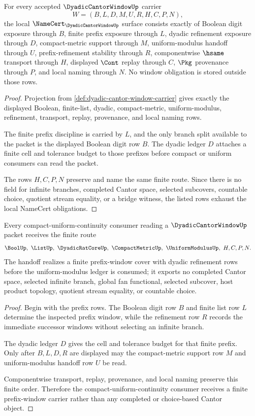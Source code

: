 \begin{theorem}
\label{thm:dyadic-cantor-window-namecert-obligations}
For every accepted $\DyadicCantorWindowUp$ carrier
$$
W=(B,L,D,M,U,R,H,C,P,N),
$$
the local $\NameCert_{\DyadicCantorWindowUp}$ surface consists exactly of Boolean digit exposure through $B$, finite prefix exposure through $L$, dyadic refinement exposure through $D$, compact-metric support through $M$, uniform-modulus handoff through $U$, prefix-refinement stability through $R$, componentwise $\hsame$ transport through $H$, displayed $\Cont$ replay through $C$, $\Pkg$ provenance through $P$, and local naming through $N$. No window obligation is stored outside those rows.
\end{theorem}
\begin{proof}
Projection from \autoref{def:dyadic-cantor-window-carrier} gives exactly the displayed Boolean, finite-list, dyadic, compact-metric, uniform-modulus, refinement, transport, replay, provenance, and local naming rows.

The finite prefix discipline is carried by $L$, and the only branch split available to the packet is the displayed Boolean digit row $B$. The dyadic ledger $D$ attaches a finite cell and tolerance budget to those prefixes before compact or uniform consumers can read the packet.

The rows $H,C,P,N$ preserve and name the same finite route. Since there is no field for infinite branches, completed Cantor space, selected subcovers, countable choice, quotient stream equality, or a bridge witness, the listed rows exhaust the local NameCert obligations.
\end{proof}

\begin{theorem}
\label{thm:dyadic-cantor-window-vision-handoff}
Every compact-uniform-continuity consumer reading a $\DyadicCantorWindowUp$ packet receives the finite route
$$
\BoolUp,\ \ListUp,\ \DyadicRatCoreUp,\ \CompactMetricUp,\ \UniformModulusUp,\ H,C,P,N .
$$
The handoff realizes a finite prefix-window cover with dyadic refinement rows before the uniform-modulus ledger is consumed; it exports no completed Cantor space, selected infinite branch, global fan functional, selected subcover, host product topology, quotient stream equality, or countable choice.
\end{theorem}
\begin{proof}
Begin with the prefix rows. The Boolean digit row $B$ and finite list row $L$ determine the inspected prefix window, while the refinement row $R$ records the immediate successor windows without selecting an infinite branch.

The dyadic ledger $D$ gives the cell and tolerance budget for that finite prefix. Only after $B,L,D,R$ are displayed may the compact-metric support row $M$ and uniform-modulus handoff row $U$ be read.

Componentwise transport, replay, provenance, and local naming preserve this finite order. Therefore the compact-uniform-continuity consumer receives a finite prefix-window carrier rather than any completed or choice-based Cantor object.
\end{proof}


